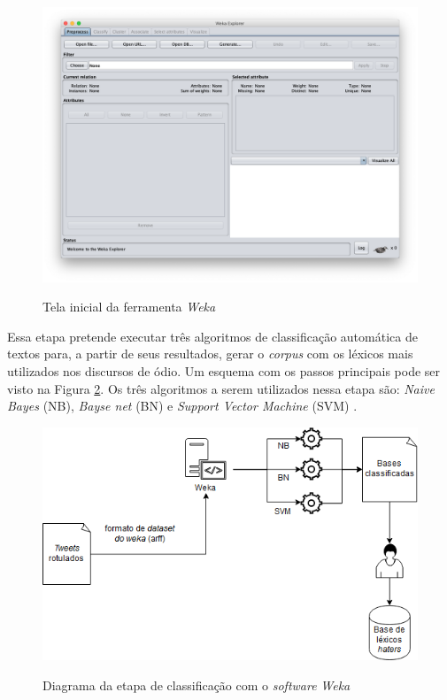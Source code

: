 \begin{figure}[!h]
\centering 
\caption{Tela inicial da ferramenta \textit{Weka}}
\includegraphics[scale=0.30]{imagens/wekatelainicial.png}
\label{fig:telaincialweka}
\end{figure}

\newpage

Essa etapa pretende executar três algoritmos de classificação automática de textos para, a partir de seus resultados, gerar o \textit{corpus} com os léxicos mais utilizados nos discursos de ódio. Um esquema com os passos principais pode ser visto na Figura \ref{fig:wekaclassificacao}. Os três algoritmos a serem utilizados nessa etapa são: \textit{Naive Bayes} (NB), \textit{Bayse net} (BN) e \textit{Support Vector Machine} (SVM) \cite{Muralidharan2012,N18-1095}. 

\begin{figure}[!h]
\centering 
\caption{Diagrama da etapa de classificação com o \textit{software} \textit{Weka}}
\includegraphics[scale=0.52]{imagens/wekaclassificacao.png}
\label{fig:wekaclassificacao}
\end{figure}

